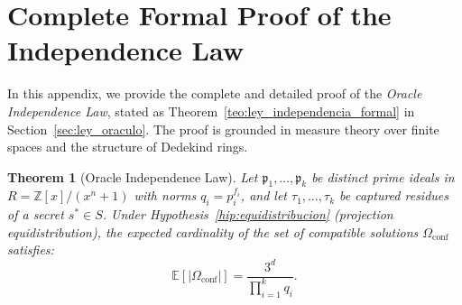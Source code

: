 \documentclass[11pt,a4paper]{article}
\theoremstyle{plain}
\newtheorem{teorema}{Theorem}[section]
\theoremstyle{definition}
\numberwithin{equation}{section}
\newcommand{\ZZ}{\mathbb{Z}}
\newcommand{\fkp}{\mathfrak{p}}
\newcommand{\E}{\mathbb{E}}
\begin{document}
\appendix

\section{Complete Formal Proof of the Independence Law}
\label{apendice:demostracion_ley}

In this appendix, we provide the complete and detailed proof of the \emph{Oracle Independence Law}, stated as Theorem~\ref{teo:ley_independencia_formal} in Section~\ref{sec:ley_oraculo}. The proof is grounded in measure theory over finite spaces and the structure of Dedekind rings.

\begin{teorema}[Oracle Independence Law]
\label{teo:ley_independencia_apendice}
Let $\fkp_1, \dots, \fkp_k$ be distinct prime ideals in $R = \ZZ[x]/(x^n+1)$ with norms $q_i = p_i^{f_i}$, and let $\tau_1, \dots, \tau_k$ be captured residues of a secret $s^* \in S$. Under Hypothesis~\ref{hip:equidistribucion} (projection equidistribution), the expected cardinality of the set of compatible solutions $\Omega_{\mathrm{conf}}$ satisfies:
\begin{equation}
\E[|\Omega_{\mathrm{conf}}|] = \frac{3^d}{\prod_{i=1}^k q_i}.
\end{equation}
\end{teorema}
\end{document}
